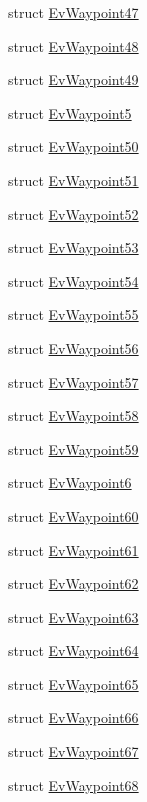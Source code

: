 \begin{DoxyCompactItemize}
struct \hyperlink{structsmacc_1_1EvWaypoint47}{Ev\+Waypoint47}
\item 
struct \hyperlink{structsmacc_1_1EvWaypoint48}{Ev\+Waypoint48}
\item 
struct \hyperlink{structsmacc_1_1EvWaypoint49}{Ev\+Waypoint49}
\item 
struct \hyperlink{structsmacc_1_1EvWaypoint5}{Ev\+Waypoint5}
\item 
struct \hyperlink{structsmacc_1_1EvWaypoint50}{Ev\+Waypoint50}
\item 
struct \hyperlink{structsmacc_1_1EvWaypoint51}{Ev\+Waypoint51}
\item 
struct \hyperlink{structsmacc_1_1EvWaypoint52}{Ev\+Waypoint52}
\item 
struct \hyperlink{structsmacc_1_1EvWaypoint53}{Ev\+Waypoint53}
\item 
struct \hyperlink{structsmacc_1_1EvWaypoint54}{Ev\+Waypoint54}
\item 
struct \hyperlink{structsmacc_1_1EvWaypoint55}{Ev\+Waypoint55}
\item 
struct \hyperlink{structsmacc_1_1EvWaypoint56}{Ev\+Waypoint56}
\item 
struct \hyperlink{structsmacc_1_1EvWaypoint57}{Ev\+Waypoint57}
\item 
struct \hyperlink{structsmacc_1_1EvWaypoint58}{Ev\+Waypoint58}
\item 
struct \hyperlink{structsmacc_1_1EvWaypoint59}{Ev\+Waypoint59}
\item 
struct \hyperlink{structsmacc_1_1EvWaypoint6}{Ev\+Waypoint6}
\item 
struct \hyperlink{structsmacc_1_1EvWaypoint60}{Ev\+Waypoint60}
\item 
struct \hyperlink{structsmacc_1_1EvWaypoint61}{Ev\+Waypoint61}
\item 
struct \hyperlink{structsmacc_1_1EvWaypoint62}{Ev\+Waypoint62}
\item 
struct \hyperlink{structsmacc_1_1EvWaypoint63}{Ev\+Waypoint63}
\item 
struct \hyperlink{structsmacc_1_1EvWaypoint64}{Ev\+Waypoint64}
\item 
struct \hyperlink{structsmacc_1_1EvWaypoint65}{Ev\+Waypoint65}
\item 
struct \hyperlink{structsmacc_1_1EvWaypoint66}{Ev\+Waypoint66}
\item 
struct \hyperlink{structsmacc_1_1EvWaypoint67}{Ev\+Waypoint67}
\item 
struct \hyperlink{structsmacc_1_1EvWaypoint68}{Ev\+Waypoint68}
\item 

\end{DoxyCompactItemize}
